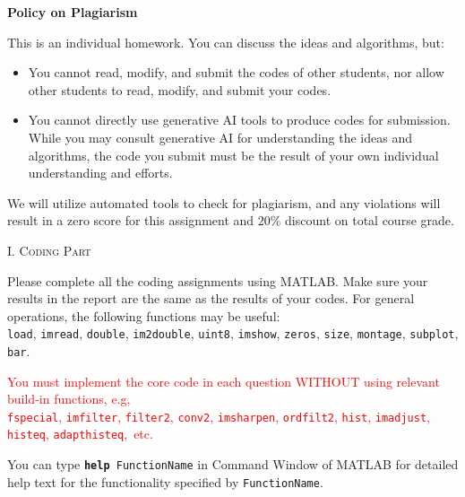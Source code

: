 \documentclass[A4paper, 11pt]{article}
\newcommand{\<}{\,\langle\,}
\renewcommand{\>}{\,\rangle}
\newcommand{\0}{\mathbf{0}}
\newcommand{\1}{\mathbf{1}}
\begin{document}
\begin{spacing}{1.3}
\vspace*{2ex}
\textbf{\large{Policy on Plagiarism}}
\vspace*{1.5ex}

This is an individual homework. You can discuss the ideas and algorithms, but:
\begin{itemize} \setlength{\parskip}{0.5ex} \vspace*{-1.5ex}
    \item You cannot read, modify, and submit the codes of other students, nor allow other students to read, modify, and submit your codes.
    \item You cannot directly use generative AI tools to produce codes for submission. While you may consult generative AI for understanding the ideas and algorithms, the code you submit must be the result of your own individual understanding and efforts.
\end{itemize} \vspace*{-1.5ex}
We will utilize automated tools to check for plagiarism, and any violations will result in a zero score for this assignment and $20\%$ discount on total course grade.

\newpage

\begin{center}
    \textsc{I. Coding Part}
\end{center}

Please complete all the coding assignments using MATLAB. Make sure your results in the report are the same as the results of your codes. For general operations, the following functions may be useful:\\
\texttt{load}, \texttt{imread}, \texttt{double}, \texttt{im2double}, \texttt{uint8}, \texttt{imshow}, \texttt{zeros}, \texttt{size}, \texttt{montage}, \texttt{subplot}, \texttt{bar}.

\textcolor{red}{You must implement the core code in each question WITHOUT using relevant build-in functions, e.g,}\\
\textcolor{red}{
\texttt{fspecial}, \texttt{imfilter}, \texttt{filter2}, \texttt{conv2}, \texttt{imsharpen}, \texttt{ordfilt2}, \texttt{hist}, \texttt{imadjust}, \texttt{histeq}, \texttt{adapthisteq},~etc.
}

\vspace*{-3.75ex}
You can type \texttt{\textbf{help} FunctionName} in Command Window of MATLAB for detailed help text for the functionality specified by \texttt{FunctionName}.

\vspace*{6ex}


\end{spacing}
\end{document}
